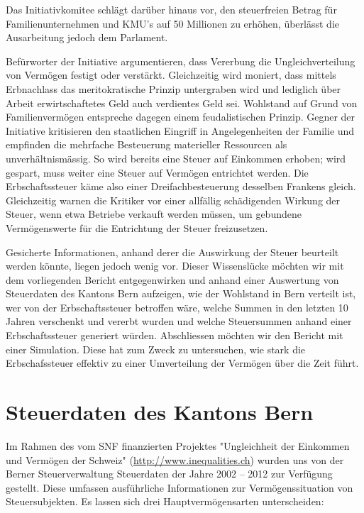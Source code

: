 \documentclass[a4paper, 12pt,liststotoc]{scrartcl}
\numberwithin{equation}{section}
\begin{document}
Das Initiativkomitee schlägt darüber hinaus vor, den steuerfreien Betrag
für Familienunternehmen und KMU's auf 50 Millionen zu erhöhen, überlässt
die Ausarbeitung jedoch dem Parlament.

Befürworter der Initiative argumentieren, dass Vererbung die
Ungleichverteilung von Vermögen festigt oder verstärkt. Gleichzeitig
wird moniert, dass mittels Erbnachlass das meritokratische Prinzip
untergraben wird und lediglich über Arbeit erwirtschaftetes Geld auch
verdientes Geld sei. Wohlstand auf Grund von Familienvermögen entspreche
dagegen einem feudalistischen Prinzip. Gegner der Initiative kritisieren
den staatlichen Eingriff in Angelegenheiten der Familie und empfinden
die mehrfache Besteuerung materieller Ressourcen als unverhältnismässig.
So wird bereits eine Steuer auf Einkommen erhoben; wird gespart, muss
weiter eine Steuer auf Vermögen entrichtet werden. Die Erbschaftssteuer
käme also einer Dreifachbesteuerung desselben Frankens gleich.
Gleichzeitig warnen die Kritiker vor einer allfällig schädigenden
Wirkung der Steuer, wenn etwa Betriebe verkauft werden müssen, um
gebundene Vermögenswerte für die Entrichtung der Steuer freizusetzen.

Gesicherte Informationen, anhand derer die Auswirkung der Steuer
beurteilt werden könnte, liegen jedoch wenig vor. Dieser Wissenslücke
möchten wir mit dem vorliegenden Bericht entgegenwirken und anhand einer
Auswertung von Steuerdaten des Kantons Bern aufzeigen, wie der Wohlstand
in Bern verteilt ist, wer von der Erbschaftssteuer betroffen wäre,
welche Summen in den letzten 10 Jahren verschenkt und vererbt wurden und
welche Steuersummen anhand einer Erbschaftssteuer generiert würden.
Abschliessen möchten wir den Bericht mit einer Simulation. Diese hat zum
Zweck zu untersuchen, wie stark die Erbschafssteuer effektiv zu einer
Umverteilung der Vermögen über die Zeit führt.

\section{Steuerdaten des Kantons
Bern}\label{steuerdaten-des-kantons-bern}

Im Rahmen des vom SNF finanzierten Projektes "Ungleichheit der Einkommen
und Vermögen der Schweiz" (\url{http://www.inequalities.ch}) wurden uns von der Berner
Steuerverwaltung Steuerdaten der Jahre 2002 -- 2012 zur Verfügung
gestellt. Diese umfassen ausführliche Informationen zur
Vermögenssituation von Steuersubjekten. Es lassen sich drei
Hauptvermögensarten unterscheiden:
\end{document}
